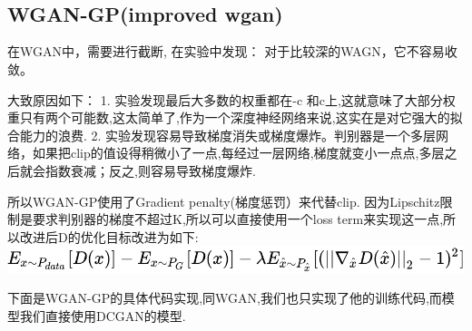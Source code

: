 \documentclass[11pt]{article}
\makeatletter
\def\maxwidth{\ifdim\Gin@nat@width>\linewidth\linewidth
    \else\Gin@nat@width\fi}
\let\Oldincludegraphics\includegraphics
\renewcommand{\includegraphics}[1]{\Oldincludegraphics[width=.8\maxwidth]{#1}}
\makeatother
\begin{document}
    \begin{center}
    \end{center}
    { \hspace*{\fill} \\}
    
    \begin{center}
    \end{center}
    { \hspace*{\fill} \\}
    
    \hypertarget{wgan-gpimproved-wgan}{%
\subsection{WGAN-GP(improved wgan)}\label{wgan-gpimproved-wgan}}

    在WGAN中，需要进行截断, 在实验中发现： 对于比较深的WAGN，它不容易收敛。

大致原因如下： 1. 实验发现最后大多数的权重都在-c
和c上,这就意味了大部分权重只有两个可能数,这太简单了,作为一个深度神经网络来说,这实在是对它强大的拟合能力的浪费.
2.
实验发现容易导致梯度消失或梯度爆炸。判别器是一个多层网络，如果把clip的值设得稍微小了一点,每经过一层网络,梯度就变小一点点,多层之后就会指数衰减；反之,则容易导致梯度爆炸.

所以WGAN-GP使用了Gradient penalty(梯度惩罚）来代替clip.
因为Lipschitz限制是要求判别器的梯度不超过K,所以可以直接使用一个loss
term来实现这一点,所以改进后D的优化目标改进为如下:
\includegraphics{pictures/wgan-gp.svg}

下面是WGAN-GP的具体代码实现,同WGAN,我们也只实现了他的训练代码,而模型我们直接使用DCGAN的模型.
\end{document}
